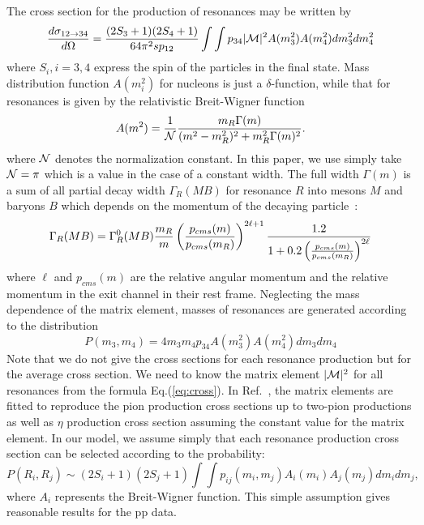 \documentclass[]{article}
\newcommand{\Mx}{\mbox{${\cal M}$}}                    %
\begin{document}
The cross section for the production of resonances may be written by
\begin{equation}
 \label{eq:cross}
 {d\sigma_{12\to34}\over d\Omega}=
    {(2S_3+1)(2S_4+1)\over 64\pi^2 s p_{12}}
    \int\int p_{34} |\Mx|^2 A(m_3^2)A(m_4^2)dm_3^2dm_4^2
\end{equation}
where $S_i, i=3,4$ express the spin of the particles in the final state.
Mass distribution function $A(m_i^2)$ for nucleons is just a $\delta$-function,
while that for resonances is given
by the relativistic Breit-Wigner function
\begin{equation}
  A(m^2)={1\over \cal N}{m_R\Gamma(m)\over (m^2-m_R^2)^2 + m_R^2\Gamma(m)^2}.
 \label{eq:rlorentz}
\end{equation}
where $\cal N$ denotes the normalization constant.
 In this paper,
we use simply take ${\cal N} = \pi$ which is a value in the case of
a constant width.
The full width $\Gamma(m)$ is a sum of all partial decay width
$\Gamma_R(MB)$ for resonance $R$ into mesons $M$ and baryons $B$
which depends on the momentum of the decaying particle~\cite{rqmd2,urqmd}:
\begin{equation}
 \Gamma_R(MB)=\Gamma^0_R(MB) {m_R\over m}
              \left({p_{cms}(m)\over p_{cms}(m_R)}\right)^{2\ell+1}
   {1.2 \over 1+0.2\left({p_{cms}(m)\over p_{cms}(m_R)}\right)^{2\ell}}
   \label{eq:width}
\end{equation}
where $\ell$ and $p_{cms}(m)$ are
 the relative angular momentum
 and 
 the relative momentum in the exit channel in their rest frame.
%
Neglecting the mass dependence of the matrix element,
   masses of resonances are generated according to the distribution
   \begin{equation}
      P(m_3,m_4)= 4m_3m_4 p_{34}A(m_3^2)A(m_4^2)dm_3dm_4
   \end{equation}
%
%
Note that we do not give the cross sections for each resonance production
  but for the average cross section.
We need to know the matrix element $|\Mx|^2$ for all resonances
  from the formula Eq.(\ref{eq:cross}).
In Ref.~\cite{Teis}, the matrix elements are fitted to reproduce
the pion production cross sections up to two-pion productions
 as well as $\eta$ production cross section assuming the constant value
 for the matrix element.
In our model, we assume simply that
 each resonance production cross section can be selected
 according to the probability:
\begin{equation}
  \label{eq:resprob}
  P(R_i,R_j) \sim (2S_i+1)(2S_j+1)\int\int
                    p_{ij}(m_i,m_j)A_i(m_i)A_j(m_j)dm_idm_j ,
\end{equation}
where $A_i$ represents the Breit-Wigner function.
This simple assumption gives reasonable results for the pp data.
\end{document}
